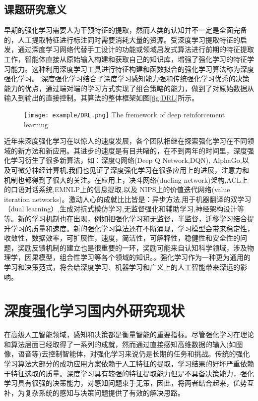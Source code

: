 \subsection{课题研究意义}
早期的强化学习需要人为干预特征的提取，然而人类的认知并不一定是全面完备的，人工提取特征进行标注同时需要消耗大量的资源。受深度学习提取特征的启发，通过深度学习网络代替手工设计的功能或领域启发式算法进行前期的特征提取工作，智能体直接从原始输入构建和获取自己的知识库，增强了强化学习的特征学习能力。这种利用深度学习工具进行特征构建和函数拟合的强化学习算法称为深度强化学习。
深度强化学习结合了深度学习感知能力强和传统强化学习优秀的决策能力的优点，通过端对端的学习方式实现了组合策略的能力，做到了对原始数据从输入到输出的直接控制。其算法的整体框架如图\ref{fig:DRL}所示。
\begin{figure}[h]
	\centering
	\texttt{[image: example/DRL.png]}
	{The fremework of deep reinforcement learning}
	\label{DRL}
\end{figure}

近年来深度强化学习在以惊人的速度发展，各个团队相继在探索强化学习在不同领域的新方法和新应用。其进步的速度是有目共睹的，在不到两年的时间里，深度强化学习衍生了很多新算法，如：深度Q网络(Deep Q Network,DQN)\cite{Roderick2017Implementing}, AlphaGo\cite{Silver2016Mastering},以及可微分神经计算机\cite{Graves2016Hybrid},我们也见证了深度强化学习在很多应用上的进展，注意力和机制也都得到了很大的关注。在应用上，决斗网络(dueling network)架构\cite{Wang2015Dueling},ACL上的口语对话系统\cite{Su2016On},EMNLP上的信息提取\cite{Narasimhan2016Improving},以及 NIPS上的价值迭代网络(value iteration networks)\cite{Tamar2017Value}。激动人心的成就比比皆是：异步方法\cite{Mnih2016Asynchronous},用于机器翻译的双学习（dual learning）\cite{Xia2016Dual},生成对抗式模仿学习\cite{Ho2016Generative},无监督强化和辅助学习\cite{Jaderberg2016Reinforcement},神经架构设计\cite{Pham2018Efficient}等等。新的学习机制也在出现，例如把强化学习和无监督，半监督，迁移学习结合提升学习的质量和速度。新的强化学习算法还在不断涌现，学习模型会带来稳定性，收敛性，数据效率，可扩展性，速度，简洁性，可解释性，稳健性和安全性的问题，奖励反馈机制的建立也是很重要的一环，奖励可能来自认知科学领域，涉及物理学，因果模型，组合性学习等各个领域的知识。。强化学习作为一种更为通用的学习和决策范式，将会给深度学习、机器学习和广义上的人工智能带来深远的影响。

\section{深度强化学习国内外研究现状}
在高级人工智能领域，感知和决策都是衡量智能的重要指标。尽管强化学习在理论和算法层面已经取得了一系列的成就，然而通过直接感知高维数据的输入(如图像，语音等)去控制智能体，对强化学习来说仍是长期的任务和挑战。传统的强化学习算法大部分的成功应用方案依赖于人工特征的提取，学习结果的好坏严重依赖于特征选取的质量。深度学习具有较强的特征提取能力但是不具备决策能力，强化学习具有很强的决策能力，对感知问题束手无策，因此，将两者结合起来，优势互补，为复杂系统的感知与决策问题提供了有效的解决思路。


